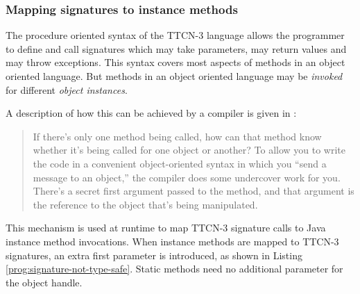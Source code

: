 \begin{program}
\caption{Definition of \texttt{address} as handle type%
	\label{prog:address-definition}}
\end{program}


\subsubsection{Mapping signatures to instance methods}

The procedure oriented syntax of the \ac{TTCN-3} language
allows the programmer to define and call signatures
which may take parameters, may return values and may throw exceptions.
This syntax covers most aspects of methods in an object oriented language.
But methods in an object oriented language
may be \emph{invoked} for different \emph{object instances}.

A description of how this can be achieved by a compiler is given in
\citep[pg.~116]{tij}:

\begin{quotation}
If there’s only one method being called, how can that method know
whether it’s being called for one object or another?
To allow you to write the code in a convenient object-oriented syntax
in which you ``send a message to an object,''
the compiler does some undercover work for you.
There’s a secret first argument passed to the method,
and that argument is the reference to the object that’s being manipulated.
\end{quotation}

This mechanism is used at runtime to map \ac{TTCN-3} signature calls
to Java instance method invocations.
When instance methods are mapped to \ac{TTCN-3} signatures,
an extra first parameter is introduced,
as shown in Listing \ref{prog:signature-not-type-safe}.
Static methods need no additional parameter for the object handle.

\begin{program}
\caption{A signature definition (with no type safety)%
	\label{prog:signature-not-type-safe}}
\end{program}

